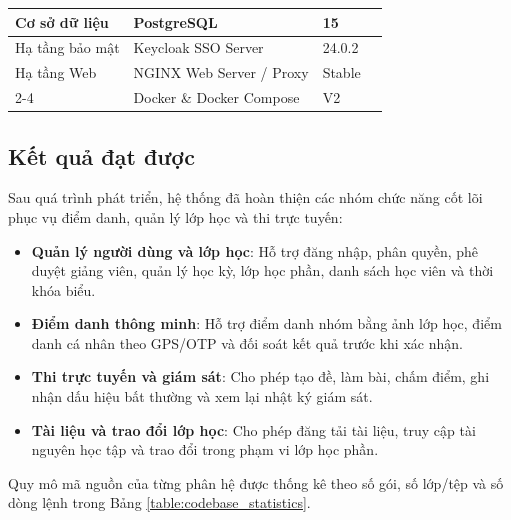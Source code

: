 \documentclass[../DoAn.tex]{subfiles}
\begin{document}
\begin{longtable}{|p{}|p{}|p{}|p{}|}
    Cơ sở dữ liệu & PostgreSQL & 15 & \cite{postgresql_docs2026} \\ \hline
    Hạ tầng bảo mật & Keycloak SSO Server & 24.0.2 & \cite{keycloak2026} \\ \hline
    Hạ tầng Web & NGINX Web Server / Proxy & Stable & \cite{nginx_docs2026} \\ \cline{2-4}
    & Docker \& Docker Compose & V2 & \cite{docker_compose_docs2026} \\ 
\end{longtable}

\subsection{Kết quả đạt được}
Sau quá trình phát triển, hệ thống đã hoàn thiện các nhóm chức năng cốt lõi phục vụ điểm danh, quản lý lớp học và thi trực tuyến:
\begin{itemize}
    \item \textbf{Quản lý người dùng và lớp học}: Hỗ trợ đăng nhập, phân quyền, phê duyệt giảng viên, quản lý học kỳ, lớp học phần, danh sách học viên và thời khóa biểu.
    \item \textbf{Điểm danh thông minh}: Hỗ trợ điểm danh nhóm bằng ảnh lớp học, điểm danh cá nhân theo GPS/OTP và đối soát kết quả trước khi xác nhận.
    \item \textbf{Thi trực tuyến và giám sát}: Cho phép tạo đề, làm bài, chấm điểm, ghi nhận dấu hiệu bất thường và xem lại nhật ký giám sát.
    \item \textbf{Tài liệu và trao đổi lớp học}: Cho phép đăng tải tài liệu, truy cập tài nguyên học tập và trao đổi trong phạm vi lớp học phần.
\end{itemize}

Quy mô mã nguồn của từng phân hệ được thống kê theo số gói, số lớp/tệp và số dòng lệnh trong Bảng \ref{table:codebase_statistics}.
\end{document}
